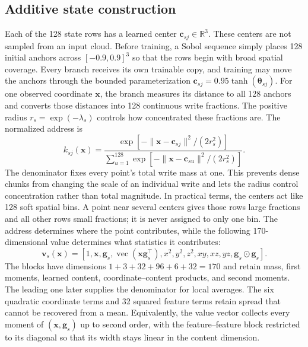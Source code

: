 \documentclass[11pt,a4paper]{article}
\newcommand{\R}{\mathbb{R}}
\newcommand{\vect}{\operatorname{vec}}
\begin{document}
\subsection{Additive state construction}
Each of the 128 state rows has a learned center $\bm c_{sj}\in\R^3$. These centers are not sampled from an input cloud. Before training, a Sobol sequence simply places 128 initial anchors across $[-0.9,0.9]^3$ so that the rows begin with broad spatial coverage. Every branch receives its own trainable copy, and training may move the anchors through the bounded parameterization $\bm c_{sj}=0.95\tanh(\bm\theta_{sj})$. For one observed coordinate $\bm x$, the branch measures its distance to all 128 anchors and converts those distances into 128 continuous write fractions. The positive radius $r_s=\exp(-\lambda_s)$ controls how concentrated these fractions are. The normalized address is
\begin{equation}
k_{sj}(\bm x)=\frac{\exp[-\|\bm x-\bm c_{sj}\|^2/(2r_s^2)]}
{\sum_{u=1}^{128}\exp[-\|\bm x-\bm c_{su}\|^2/(2r_s^2)]}.
\label{eq:key-main}
\end{equation}
The denominator fixes every point's total write mass at one. This prevents dense chunks from changing the scale of an individual write and lets the radius control concentration rather than total magnitude. In practical terms, the centers act like 128 soft spatial bins. A point near several centers gives those rows large fractions and all other rows small fractions; it is never assigned to only one bin. The address determines where the point contributes, while the following 170-dimensional value determines what statistics it contributes:
\begin{equation}
\bm v_s(\bm x)=[1,\bm x,\bm g_s,\vect(\bm x\bm g_s^\top),
 x^2,y^2,z^2,xy,xz,yz,\bm g_s\odot\bm g_s].
\label{eq:value-main}
\end{equation}
The blocks have dimensions $1+3+32+96+6+32=170$ and retain mass, first moments, learned content, coordinate--content products, and second moments. The leading one later supplies the denominator for local averages. The six quadratic coordinate terms and 32 squared feature terms retain spread that cannot be recovered from a mean. Equivalently, the value vector collects every moment of $(\bm x,\bm g_s)$ up to second order, with the feature--feature block restricted to its diagonal so that its width stays linear in the content dimension.
\end{document}
